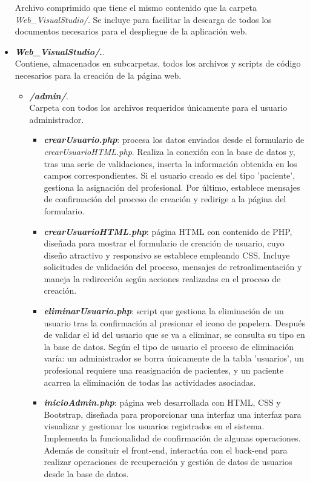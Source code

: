 \begin{itemize}
    Archivo comprimido que tiene el mismo contenido que la carpeta \textit{Web\_VisualStudio/}. Se incluye para facilitar la descarga de todos los documentos necesarios para el despliegue de la aplicación web.
    \item \textbf{\textit{Web\_VisualStudio/}.}.\\ 
    Contiene, almacenados en subcarpetas, todos los archivos y scripts de código necesarios para la creación de la página web.
    \begin{itemize}
        \item \textbf{\textit{/admin/}}.\\
        Carpeta con todos los archivos requeridos únicamente para el usuario administrador.
        \begin{itemize}
            \item \textbf{\textit{crearUsuario.php}}: procesa los datos enviados desde el formulario de \textit{crearUsuarioHTML.php}. Realiza la conexión con la base de datos y, tras una serie de validaciones, inserta la información obtenida en los campos correspondientes. Si el usuario creado es del tipo 'paciente', gestiona la asignación del profesional. Por último, establece mensajes de confirmación del proceso de creación y redirige a la página del formulario.
            \item \textbf{\textit{crearUsuarioHTML.php}}: página HTML con contenido de PHP, diseñada para mostrar el formulario de creación de usuario, cuyo diseño atractivo y responsivo se establece empleando CSS. Incluye solicitudes de validación del proceso, mensajes de retroalimentación y maneja la redirección según acciones realizadas en el proceso de creación.
            \item \textbf{\textit{eliminarUsuario.php}}: script que gestiona la eliminación de un usuario tras la confirmación al presionar el icono de papelera. Después de validar el id del usuario que se va a eliminar, se consulta su tipo en la base de datos. Según el tipo de usuario el proceso de eliminación varía: un administrador se borra únicamente de la tabla 'usuarios', un profesional requiere una reasignación de pacientes, y un paciente acarrea la eliminación de todas las actividades asociadas.
            \item \textbf{\textit{inicioAdmin.php}}: página web desarrollada con HTML, CSS y Bootstrap, diseñada para proporcionar una interfaz una interfaz para visualizar y gestionar los usuarios registrados en el sistema. Implementa la funcionalidad de confirmación de algunas operaciones. Además de consituir el front-end, interactúa con el back-end para realizar operaciones de recuperación y gestión de datos de usuarios desde la base de datos.

\end{itemize}
\end{itemize}
\end{itemize}
